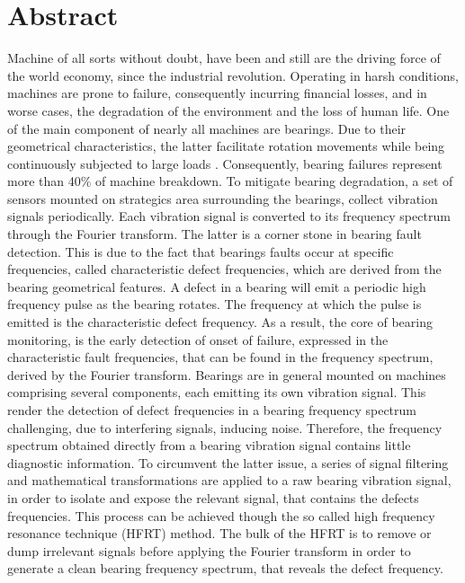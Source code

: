 \documentclass[../Main/thesis.tex]{subfiles}
\begin{document}
\null\vfill
{}
\chapter*{Abstract}
Machine of all sorts without doubt, have been and still are the driving force of the world economy, since the industrial revolution.
Operating in harsh conditions, machines are prone to failure, consequently incurring financial losses, and in worse cases, the degradation of the environment and the loss of human life. 
\justify
 One of the main component of nearly all machines are bearings. Due to their  geometrical characteristics, the latter facilitate rotation movements while being continuously subjected to large loads . Consequently, bearing failures represent more than 40$\%$ of machine breakdown. To mitigate
 bearing degradation, a set of sensors mounted on strategics area surrounding the bearings, collect vibration signals periodically. Each vibration signal is converted to its frequency spectrum through the Fourier transform. The latter is a corner stone in bearing fault detection. This is due to the fact that bearings faults occur at specific frequencies, called characteristic defect frequencies, which are derived from the bearing geometrical features. A defect in a bearing will emit a periodic high frequency pulse as the bearing rotates. The frequency at which the pulse is emitted is the characteristic defect frequency.
 As a result, the core of bearing monitoring, is the early detection of onset of failure, expressed in the characteristic fault frequencies, that can be found in the frequency spectrum, derived by the Fourier transform.
 \justify
 Bearings are in general mounted on machines comprising several components, each emitting its own vibration signal.
 This render the detection of defect frequencies in a bearing frequency spectrum challenging, due to interfering  signals, inducing noise. Therefore, the frequency spectrum obtained directly from a bearing vibration signal contains little diagnostic information. To circumvent the latter issue, a series of signal filtering and mathematical transformations are applied to a raw bearing vibration signal, in order to isolate and expose the relevant signal, that contains the defects frequencies. This process can be achieved though the so called high frequency resonance technique (HFRT) method. The bulk of the HFRT is to remove or dump irrelevant signals before applying the Fourier transform in order to generate a clean bearing frequency spectrum, that reveals the defect frequency.
\end{document}
